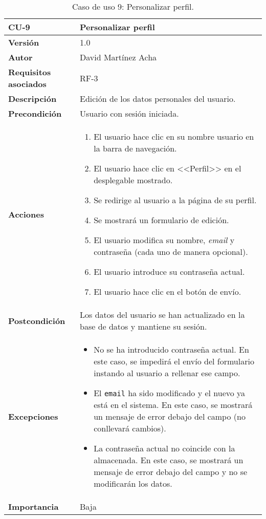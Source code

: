 \begin{table}[p]
	\centering
	\begin{tabularx}{\linewidth}{ p{} p{} }
		\toprule
		\textbf{CU-9}    & \textbf{Personalizar perfil}\\
		\toprule
		\textbf{Versión}              & 1.0    \\
		\textbf{Autor}                & David Martínez Acha \\
		\textbf{Requisitos asociados} & RF-3 \\
		\textbf{Descripción}          & Edición de los datos personales del usuario. \\
		\textbf{Precondición}         & Usuario con sesión iniciada. \\
		\textbf{Acciones}             &
		\begin{enumerate}
			\def\labelenumi{\arabic{enumi}.}
			\tightlist
			\item El usuario hace clic en su nombre usuario en la barra de navegación.
			\item El usuario hace clic en <<Perfil>> en el desplegable mostrado.
			\item Se redirige al usuario a la página de su perfil.
			\item Se mostrará un formulario de edición.
			\item El usuario modifica su nombre, \textit{email} y contraseña (cada uno de manera opcional).
			\item El usuario introduce su contraseña actual.
			\item El usuario hace clic en el botón de envío.
		\end{enumerate}\\
		\textbf{Postcondición}        & Los datos del usuario se han actualizado en la base de datos y mantiene su sesión. \\
		\textbf{Excepciones}          & \begin{itemize}
			\item No se ha introducido contraseña actual. En este caso, se impedirá el envío del formulario instando al usuario a rellenar ese campo.
			\item El \texttt{email} ha sido modificado y el nuevo ya está en el sistema. En este caso, se mostrará un mensaje de error debajo del campo (no conllevará cambios).
			\item La contraseña actual no coincide con la almacenada. En este caso, se mostrará un mensaje de error debajo del campo y no se modificarán los datos.
		\end{itemize}\\
		\textbf{Importancia}          & Baja \\
		\bottomrule
	\end{tabularx}
	\caption{Caso de uso 9: Personalizar perfil.}
\end{table}

